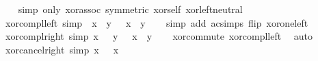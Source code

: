 \begin{isabellebody}
%
\isadelimproof
\ \ %
\endisadelimproof
%
\isatagproof
{}\isamarkupfalse%
\ {\isacharparenleft}{\kern0pt}simp\ only{\isacharcolon}{\kern0pt}\ xor{\isachardot}{\kern0pt}assoc\ {\isacharbrackleft}{\kern0pt}symmetric{\isacharbrackright}{\kern0pt}\ xor{\isacharunderscore}{\kern0pt}self\ xor{\isachardot}{\kern0pt}left{\isacharunderscore}{\kern0pt}neutral{\isacharparenright}{\kern0pt}%
\endisatagproof
{\isafoldproof}%
%
\isadelimproof
\isanewline
%
\endisadelimproof
\isanewline
{}\isamarkupfalse%
\ xor{\isacharunderscore}{\kern0pt}compl{\isacharunderscore}{\kern0pt}left\ {\isacharbrackleft}{\kern0pt}simp{\isacharbrackright}{\kern0pt}{\isacharcolon}{\kern0pt}\ {\isachardoublequoteopen}\isactrlbold {\isacharminus}{\kern0pt}\ x\ \isactrlbold {\isasymominus}\ y\ {\isacharequal}{\kern0pt}\ \isactrlbold {\isacharminus}{\kern0pt}\ {\isacharparenleft}{\kern0pt}x\ \isactrlbold {\isasymominus}\ y{\isacharparenright}{\kern0pt}{\isachardoublequoteclose}\isanewline
%
\isadelimproof
\ \ %
\endisadelimproof
%
\isatagproof
{}\isamarkupfalse%
\ {\isacharparenleft}{\kern0pt}simp\ add{\isacharcolon}{\kern0pt}\ ac{\isacharunderscore}{\kern0pt}simps\ flip{\isacharcolon}{\kern0pt}\ xor{\isacharunderscore}{\kern0pt}one{\isacharunderscore}{\kern0pt}left{\isacharparenright}{\kern0pt}%
\endisatagproof
{\isafoldproof}%
%
\isadelimproof
\isanewline
%
\endisadelimproof
\isanewline
{}\isamarkupfalse%
\ xor{\isacharunderscore}{\kern0pt}compl{\isacharunderscore}{\kern0pt}right\ {\isacharbrackleft}{\kern0pt}simp{\isacharbrackright}{\kern0pt}{\isacharcolon}{\kern0pt}\ {\isachardoublequoteopen}x\ \isactrlbold {\isasymominus}\ \isactrlbold {\isacharminus}{\kern0pt}\ y\ {\isacharequal}{\kern0pt}\ \isactrlbold {\isacharminus}{\kern0pt}\ {\isacharparenleft}{\kern0pt}x\ \isactrlbold {\isasymominus}\ y{\isacharparenright}{\kern0pt}{\isachardoublequoteclose}\isanewline
%
\isadelimproof
\ \ %
\endisadelimproof
%
\isatagproof
{}\isamarkupfalse%
\ xor{\isachardot}{\kern0pt}commute\ xor{\isacharunderscore}{\kern0pt}compl{\isacharunderscore}{\kern0pt}left\ \isamarkupfalse%
\ auto%
\endisatagproof
{\isafoldproof}%
%
\isadelimproof
\isanewline
%
\endisadelimproof
\isanewline
{}\isamarkupfalse%
\ xor{\isacharunderscore}{\kern0pt}cancel{\isacharunderscore}{\kern0pt}right\ {\isacharbrackleft}{\kern0pt}simp{\isacharbrackright}{\kern0pt}{\isacharcolon}{\kern0pt}\ {\isachardoublequoteopen}x\ \isactrlbold {\isasymominus}\ \isactrlbold {\isacharminus}{\kern0pt}\ x\ {\isacharequal}{\kern0pt}\ \isanewline

\end{isabellebody}
